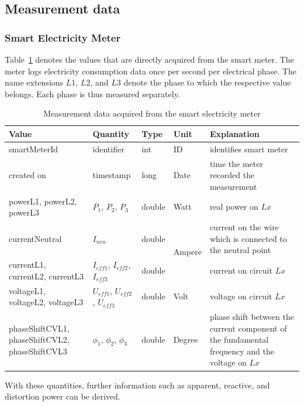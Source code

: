 \subsection{Measurement data}
\subsubsection{Smart Electricity Meter}
Table~\ref{tab:meter_values} denotes the values that are directly acquired from the smart meter. The meter logs electricity consumption data once per second per electrical phase. The name extensions $L1$, $L2$, and $L3$ denote the phase to which the respective value belongs. 
Each phase is thus measured separately. 

\begin{table}[htdp]
\caption{Measurement data acquired from the smart electricity meter\cite{recognize_home_appliances}}
\begin{center}
\begin{tabular}{|p{3cm}|l|l|l|p{4cm}|}
\hline
Value & Quantity & Type & Unit & Explanation \\
\hline
\hline
smartMeterId & identifier & int & ID & identifies smart meter\\
\hline
created on & timestamp & long & Date & time the meter recorded the measurement\\
\hline 
powerL1, powerL2, powerL3 & $P_1$, $P_2$, $P_3$ & double & Watt & real power on $Lx$\\
\hline
currentNeutral & $I_{neu}$ & double & \multirow{2}{*}{Ampere} & current on the wire which is connected to the neutral point \\
\cline{1-3}\cline{5-5}   
currentL1, currentL2, currentL3 & $I_{eff1}$, $I_{eff2}$, $I_{eff3}$ & double & & current on circuit $Lx$\\
\hline
voltageL1, voltageL2, voltageL3 & $U_{eff1}$, $U_{eff2}$, $U_{eff3}$ & double & Volt & voltage on circuit $Lx$\\ 
\hline
phaseShiftCVL1, phaseShiftCVL2, phaseShiftCVL3 & $\phi_1$, $\phi_2$, $\phi_3$ & double & Degree & phase shift between the current component of the fundamental frequency and the voltage on $Lx$\\
\hline      
\end{tabular}
\end{center}
\label{tab:meter_values}
\end{table}%

With these quantities, further information such as apparent, reactive, and distortion power can be derived. 

